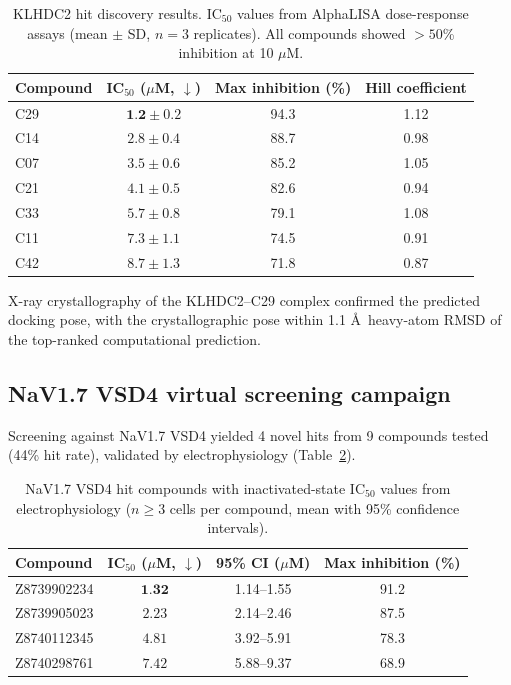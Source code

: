 \documentclass[11pt]{article}
\begin{document}
\begin{table}[H]
\centering
\caption{KLHDC2 hit discovery results. IC$_{50}$ values from AlphaLISA dose-response assays (mean $\pm$ SD, $n = 3$ replicates). All compounds showed $> 50$\% inhibition at 10 $\mu$M.}
\label{tab:klhdc2}
\begin{tabular}{lccc}
\toprule
\textbf{Compound} & \textbf{IC$_{50}$ ($\mu$M, $\downarrow$)} & \textbf{Max inhibition (\%)} & \textbf{Hill coefficient} \\
\midrule
C29 & $\textbf{1.2} \pm 0.2$ & 94.3 & 1.12 \\
C14 & $2.8 \pm 0.4$ & 88.7 & 0.98 \\
C07 & $3.5 \pm 0.6$ & 85.2 & 1.05 \\
C21 & $4.1 \pm 0.5$ & 82.6 & 0.94 \\
C33 & $5.7 \pm 0.8$ & 79.1 & 1.08 \\
C11 & $7.3 \pm 1.1$ & 74.5 & 0.91 \\
C42 & $8.7 \pm 1.3$ & 71.8 & 0.87 \\
\bottomrule
\end{tabular}
\end{table}

X-ray crystallography of the KLHDC2--C29 complex confirmed the predicted docking pose, with the crystallographic pose within 1.1 \AA\ heavy-atom RMSD of the top-ranked computational prediction.

\subsection{NaV1.7 VSD4 virtual screening campaign}

Screening against NaV1.7 VSD4 yielded 4 novel hits from 9 compounds tested (44\% hit rate), validated by electrophysiology (Table~\ref{tab:nav17}).

\begin{table}[H]
\centering
\caption{NaV1.7 VSD4 hit compounds with inactivated-state IC$_{50}$ values from electrophysiology ($n \geq 3$ cells per compound, mean with 95\% confidence intervals).}
\label{tab:nav17}
\begin{tabular}{lccc}
\toprule
\textbf{Compound} & \textbf{IC$_{50}$ ($\mu$M, $\downarrow$)} & \textbf{95\% CI ($\mu$M)} & \textbf{Max inhibition (\%)} \\
\midrule
Z8739902234 & $\textbf{1.32}$ & 1.14--1.55 & 91.2 \\
Z8739905023 & $2.23$ & 2.14--2.46 & 87.5 \\
Z8740112345 & $4.81$ & 3.92--5.91 & 78.3 \\
Z8740298761 & $7.42$ & 5.88--9.37 & 68.9 \\
\bottomrule
\end{tabular}
\end{table}
\end{document}
